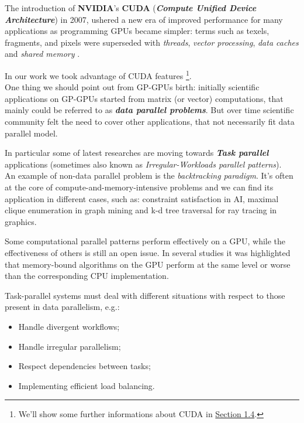 	The introduction of \textbf{NVIDIA}’s \textbf{CUDA} (\textbf{\textit{Compute Unified Device Architecture}}) in 2007, ushered a new era of improved performance for many applications as programming GPUs became simpler: terms such as texels, fragments, and pixels were superseded with \textit{threads}, \textit{vector processing}, \textit{data caches} and \textit{shared memory} \cite{fromCUtoOCL}. 
	
	In our work we took advantage of CUDA features  \footnote{We'll show some further informations about CUDA in \hyperref[sect:tools]{Section 1.4}.}. \\
	
	One thing we should point out from GP-GPUs birth: initially scientific applications on GP-GPUs started from matrix (or vector) computations, that mainly could be referred to as \textbf{\textit{data parallel problems}}.
	But over time scientific community felt the need to cover other applications, that not necessarily fit data parallel model.
	
	In particular some of latest researches are moving towards \textbf{\textit{Task parallel}} applications (sometimes also known as \textit{Irregular-Workloads parallel patterns}).\\
	
	An example of non-data parallel problem is the \textit{backtracking paradigm}.
	It's often at the core of compute-and-memory-intensive problems and we can find its application in different cases, such as: constraint satisfaction in AI, maximal clique enumeration in graph mining and k-d tree traversal for ray tracing in graphics.
	
	Some computational parallel patterns perform effectively on a GPU, while the effectiveness of others is still an open issue. 		
	In several studies it was highlighted that memory-bound algorithms on the GPU perform at the same level or worse than the corresponding CPU implementation. 
	
	Task-parallel systems must deal with different situations with respect to those present in data parallelism, e.g.:
	\begin{itemize}
		\item Handle divergent workflows;
		\item Handle irregular parallelism;
		\item Respect dependencies between tasks;
		\item Implementing efficient load balancing.
	\end{itemize}
	
